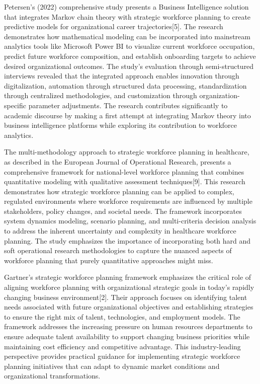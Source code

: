 \documentclass[main.tex]{subfiles}
\begin{document}
Petersen's (2022) comprehensive study presents a Business Intelligence solution that integrates Markov chain theory with strategic workforce planning to create predictive models for organizational career trajectories[5]. The research demonstrates how mathematical modeling can be incorporated into mainstream analytics tools like Microsoft Power BI to visualize current workforce occupation, predict future workforce composition, and establish onboarding targets to achieve desired organizational outcomes. The study's evaluation through semi-structured interviews revealed that the integrated approach enables innovation through digitalization, automation through structured data processing, standardization through centralized methodologies, and customization through organization-specific parameter adjustments. The research contributes significantly to academic discourse by making a first attempt at integrating Markov theory into business intelligence platforms while exploring its contribution to workforce analytics.

The multi-methodology approach to strategic workforce planning in healthcare, as described in the European Journal of Operational Research, presents a comprehensive framework for national-level workforce planning that combines quantitative modeling with qualitative assessment techniques[9]. This research demonstrates how strategic workforce planning can be applied to complex, regulated environments where workforce requirements are influenced by multiple stakeholders, policy changes, and societal needs. The framework incorporates system dynamics modeling, scenario planning, and multi-criteria decision analysis to address the inherent uncertainty and complexity in healthcare workforce planning. The study emphasizes the importance of incorporating both hard and soft operational research methodologies to capture the nuanced aspects of workforce planning that purely quantitative approaches might miss.

Gartner's strategic workforce planning framework emphasizes the critical role of aligning workforce planning with organizational strategic goals in today's rapidly changing business environment[2]. Their approach focuses on identifying talent needs associated with future organizational objectives and establishing strategies to ensure the right mix of talent, technologies, and employment models. The framework addresses the increasing pressure on human resources departments to ensure adequate talent availability to support changing business priorities while maintaining cost efficiency and competitive advantage. This industry-leading perspective provides practical guidance for implementing strategic workforce planning initiatives that can adapt to dynamic market conditions and organizational transformations.
\end{document}
